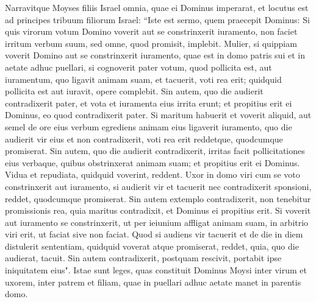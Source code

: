 \begin{biblechapter}  
\verse Narravitque Moyses filiis Israel omnia, quae ei Dominus imperarat, 
\verse et locutus est ad principes tribuum filiorum Israel: “Iste est sermo, quem praecepit Dominus: 
\verse Si quis virorum votum Domino voverit aut se constrinxerit iuramento, non faciet irritum verbum suum, sed omne, quod promisit, implebit. 
\verse Mulier, si quippiam voverit Domino aut se constrinxerit iuramento, quae est in domo patris sui et in aetate adhuc puellari, 
\verse si cognoverit pater votum, quod pollicita est, aut iuramentum, quo ligavit animam suam, et tacuerit, voti rea erit; quidquid pollicita est aut iuravit, opere complebit. 
\verse Sin autem, quo die audierit contradixerit pater, et vota et iuramenta eius irrita erunt; et propitius erit ei Dominus, eo quod contradixerit pater. 
\verse Si maritum habuerit et voverit aliquid, aut semel de ore eius verbum egrediens animam eius ligaverit iuramento, 
\verse quo die audierit vir eius et non contradixerit, voti rea erit reddetque, quodcumque promiserat. 
\verse Sin autem, quo die audierit contradixerit, irritas facit pollicitationes eius verbaque, quibus obstrinxerat animam suam; et propitius erit ei Dominus. 
\verse Vidua et repudiata, quidquid voverint, reddent. 
\verse Uxor in domo viri cum se voto constrinxerit aut iuramento, 
\verse si audierit vir et tacuerit nec contradixerit sponsioni, reddet, quodcumque promiserat.  
\verse Sin autem extemplo contradixerit, non tenebitur promissionis rea, quia maritus contradixit, et Dominus ei propitius erit. 
\verse Si voverit aut iuramento se constrinxerit, ut per ieiunium affligat animam suam, in arbitrio viri erit, ut faciat sive non faciat. 
\verse Quod si audiens vir tacuerit et de die in diem distulerit sententiam, quidquid voverat atque promiserat, reddet, quia, quo die audierat, tacuit. 
\verse Sin autem contradixerit, postquam rescivit, portabit ipse iniquitatem eius". 
\verse Istae sunt leges, quas constituit Dominus Moysi inter virum et uxorem, inter patrem et filiam, quae in puellari adhuc aetate manet in parentis domo. 
\end{biblechapter}

